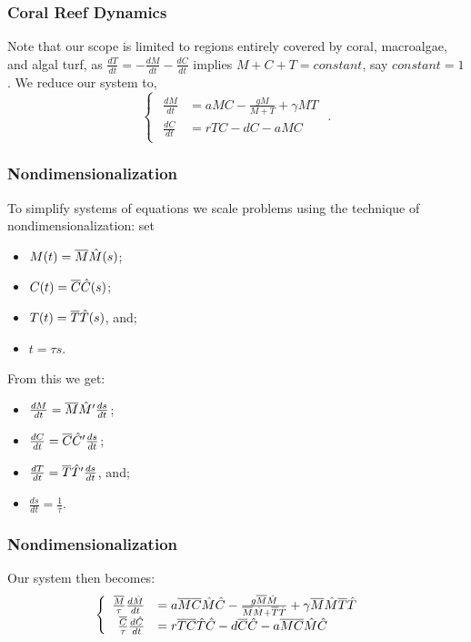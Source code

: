 \begin{frame}\frametitle{Coral Reef Dynamics}
\hspace{1.57em}Note that our scope is limited to regions entirely covered by coral, macroalgae, and algal turf, as $\frac{dT}{dt}=-\frac{dM}{dt}-\frac{dC}{dt}$ implies $M+C+T=constant$, say $constant = 1$.  We reduce our system to, $$\begin{cases} 
\begin{array}{rl}
\frac{dM}{dt}&= aMC-\frac{gM}{M+T} + \gamma MT\\ 
\frac{dC}{dt}&=rTC-dC-aMC
\end{array} \end{cases}.$$ 
\end{frame}

\begin{frame}
  \frametitle{Nondimensionalization}
  \hspace{1.57em}To simplify systems of equations we scale problems using the technique of nondimensionalization: set {\begin{itemize}\itemsep0pt\item $M(t)=\overline{M}\HAT{M}(s)$;\\\item $C(t)=\overline{C}\HAT{C}(s)$;\\\item $T(t)=\overline{T}\HAT{T}(s)$, and;\\\item $t=\tau s$. \end{itemize} From this we get: \begin{itemize}\itemsep0pt \item$\frac{dM}{dt}=\overline{M}\HAT{M}'\frac{ds}{dt}$;\\\item $\frac{dC}{dt}=\overline{C}\HAT{C}'\frac{ds}{dt}$;\\\item $\frac{dT}{dt}=\overline{T}\HAT{T}'\frac{ds}{dt}$, and;\\ \item $\frac{ds}{dt}=\frac{1}{\tau}.$\end{itemize} }
  \end{frame}
 \begin{frame}
  \frametitle{Nondimensionalization}Our system then becomes: $$\begin{cases} 
\begin{array}{rl}
\frac{\overline{M}}{\tau}\frac{d\HAT{M}}{dt}&= a\overline{M}\overline{C}\HAT{M}\HAT{C}-\frac{g\overline{M}\HAT{M}}{\overline{M}\HAT{M}+\overline{T}\HAT{T}} + \gamma \overline{M}\HAT{M}\overline{T}\HAT{T}\\ 
\frac{\overline{C}}{\tau}\frac{d\HAT{C}}{dt}&=r\overline{T}\overline{C}\HAT{T}\HAT{C}-d\overline{C}\HAT{C}-a\overline{M}\overline{C}\HAT{M}\HAT{C}
\end{array} \end{cases}$$
\end{frame}

